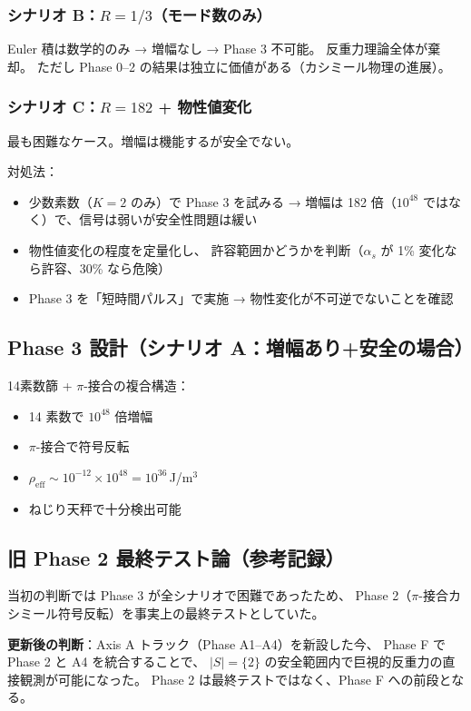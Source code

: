 \documentclass[11pt,a4paper]{article}
\begin{document}
\subsubsection{シナリオ B：$R = 1/3$（モード数のみ）}

Euler 積は数学的のみ → 増幅なし → Phase 3 不可能。
反重力理論全体が棄却。
ただし Phase 0--2 の結果は独立に価値がある（カシミール物理の進展）。

\subsubsection{シナリオ C：$R = 182$ + 物性値変化}

最も困難なケース。増幅は機能するが安全でない。

対処法：
\begin{itemize}
\item 少数素数（$K = 2$ のみ）で Phase 3 を試みる
  → 増幅は 182 倍（$10^{48}$ ではなく）で、信号は弱いが安全性問題は緩い
\item 物性値変化の程度を定量化し、
  許容範囲かどうかを判断（$\alpha_s$ が 1\% 変化なら許容、30\% なら危険）
\item Phase 3 を「短時間パルス」で実施
  → 物性変化が不可逆でないことを確認
\end{itemize}

\subsection{Phase 3 設計（シナリオ A：増幅あり+安全の場合）}

14素数篩 + $\pi$-接合の複合構造：
\begin{itemize}
\item 14 素数で $10^{48}$ 倍増幅
\item $\pi$-接合で符号反転
\item $\rho_{\mathrm{eff}} \sim 10^{-12} \times 10^{48} = 10^{36}$\,J/m$^3$
\item ねじり天秤で十分検出可能
\end{itemize}

\subsection{旧 Phase 2 最終テスト論（参考記録）}

\begin{tcolorbox}[colback=gray!5,colframe=gray!50!black,title=廃止前の判断（参考）]
当初の判断では Phase 3 が全シナリオで困難であったため、
Phase 2（$\pi$-接合カシミール符号反転）を事実上の最終テストとしていた。

\textbf{更新後の判断}：Axis A トラック（Phase A1--A4）を新設した今、
Phase F で Phase 2 と A4 を統合することで、
$|S|=\{2\}$ の安全範囲内で巨視的反重力の直接観測が可能になった。
Phase 2 は最終テストではなく、Phase F への前段となる。
\end{tcolorbox}
\end{document}
